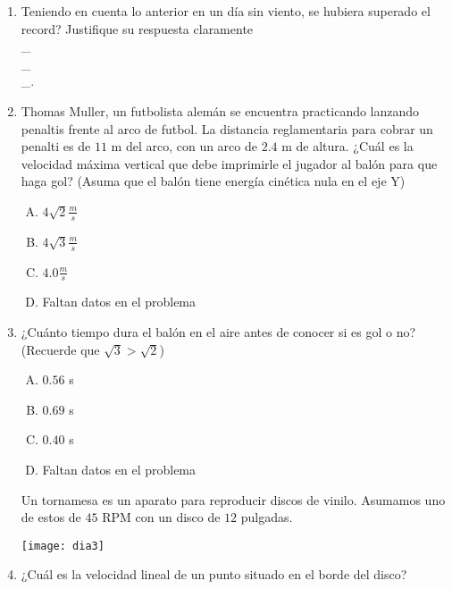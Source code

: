 \begin{enumerate}
\item Teniendo en cuenta lo anterior en un día sin viento, se hubiera superado el record? Justifique su respuesta claramente \label{dia-5} \hrulefill\\
\_\hrulefill\\
\_\hrulefill\\
\_\hrulefill.

\newpage
\item Thomas Muller, un futbolista alemán se encuentra practicando lanzando penaltis frente al arco de futbol. La distancia reglamentaria para cobrar un penalti es de $11$ m del arco, con un arco de $2.4$ m de altura. \label{dia-6}
\noindent ¿Cuál es la velocidad máxima vertical que debe imprimirle el jugador al balón para que haga gol? (Asuma que el balón tiene energía cinética nula en el eje Y)

\begin{enumerate}[(A)]
\item $4 \sqrt{2}\frac{m}{s}$
\item $4 \sqrt{3}\frac{m}{s}$
\item $4.0\frac{m}{s}$
\item Faltan datos en el problema
\end{enumerate}


\item ¿Cuánto tiempo dura el balón en el aire antes de conocer si es gol o no? (Recuerde que $\sqrt{3}>\sqrt{2}$) \label{dia-7}

\begin{enumerate}[(A)]
\item $0.56$ s
\item $0.69$ s
\item $0.40$ s
\item Faltan datos en el problema
\end{enumerate}

\noindent Un tornamesa es un aparato para reproducir discos de vinilo. Asumamos uno de estos de $45$ RPM con un disco de $12$ pulgadas. 

\begin{center}
\texttt{[image: dia3]}
\end{center}

\newpage
\item ¿Cuál es la velocidad lineal de un punto situado en el borde del disco? \label{dia-8}


\end{enumerate}
